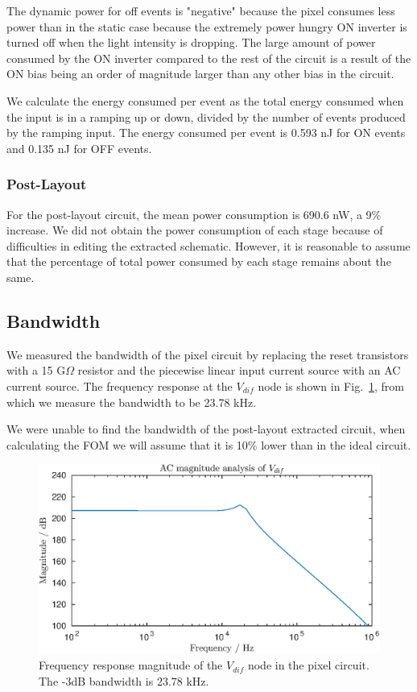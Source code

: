 The dynamic power for off events is "negative" because the pixel consumes less power than in the static case because
the extremely power hungry ON inverter is turned off when the light intensity is dropping. The large amount of power
consumed by the ON inverter compared to the rest of the circuit is a result of the ON bias being an order of magnitude
larger than any other bias in the circuit.

We calculate the energy consumed per event as the total energy consumed when the input is in a ramping up or down,
divided by the number of events produced by the ramping input.
The energy consumed per event is 0.593 nJ for ON events and 0.135 nJ for OFF events.

\subsubsection{Post-Layout}
For the post-layout circuit, the mean power consumption is 690.6 nW, a 9\% increase. We did not obtain the power 
consumption of each stage because of difficulties in editing the extracted schematic. However, it is
reasonable to assume that the percentage of total power consumed by each stage remains about the same.

\subsection{Bandwidth}
We measured the bandwidth of the pixel circuit by replacing the reset transistors with a 15 G\(\Omega\) resistor and
the piecewise linear input current source with an AC current source. The frequency response at the \(V_{dif}\) node
is shown in Fig.~\ref{fig:freqresp}, from which we measure the bandwidth to be 23.78 kHz. 

We were unable to find the bandwidth of the post-layout extracted circuit, when calculating the FOM we will assume
that it is 10\% lower than in the ideal circuit.
\begin{figure}
    \center
    \includegraphics{pixel-bode.eps}
    \caption{Frequency response magnitude of the \(V_{dif}\) node in the pixel circuit. The -3dB bandwidth is 23.78 kHz.}
    \label{fig:freqresp}
\end{figure}

